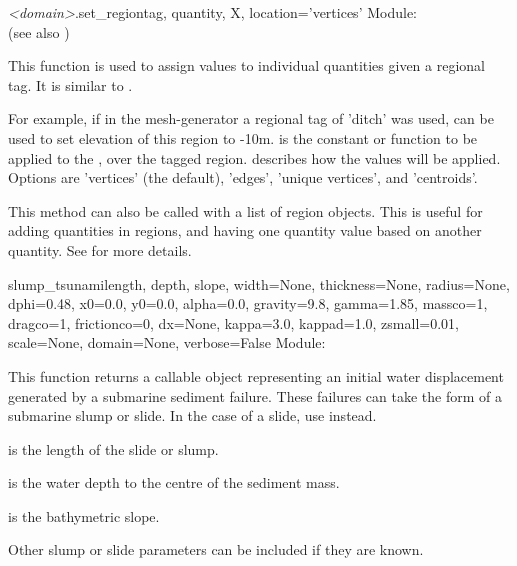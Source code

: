\documentclass{manual}
\begin{document}
\begin{methoddesc}{\emph{<domain>}.set_region}{tag, quantity, X, location='vertices'}
Module:  \\
(see also )

This function is used to assign values to individual quantities given
a regional tag.   It is similar to .

For example, if in the mesh-generator a regional tag of 'ditch' was
used,  can be used to set elevation of this region to
-10m.  is the constant or function to be applied to the ,
over the tagged region.   describes how the values will be
applied.  Options are 'vertices' (the default), 'edges', 'unique
vertices', and 'centroids'.

This method can also be called with a list of region objects.  This is
useful for adding quantities in regions, and having one quantity
value based on another quantity. See   for
more details.
\end{methoddesc}

\begin{funcdesc}{slump_tsunami}{length, depth, slope, width=None, thickness=None,
                                radius=None, dphi=0.48, x0=0.0, y0=0.0, alpha=0.0,
                                gravity=9.8, gamma=1.85,
                                massco=1, dragco=1, frictionco=0,
                                dx=None, kappa=3.0, kappad=1.0, zsmall=0.01, scale=None,
                                domain=None,
                                verbose=False}
Module: 

This function returns a callable object representing an initial water
displacement generated by a submarine sediment failure. These failures can take the form of
a submarine slump or slide. In the case of a slide, use  instead.

 is the length of the slide or slump.

 is the water depth to the centre of the sediment mass.

 is the bathymetric slope.

Other slump or slide parameters can be included if they are known.
\end{funcdesc}
\end{document}
